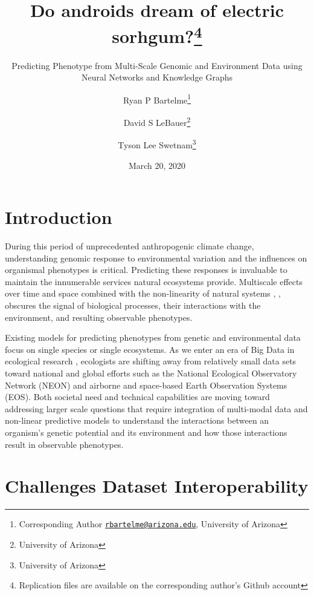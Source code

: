 \documentclass[11pt,]{article}
\title{Do androids dream of electric sorhgum?\thanks{Replication files are available on the corresponding author's Github
account}}
\subtitle{Predicting Phenotype from Multi-Scale Genomic and Environment Data using
Neural Networks and Knowledge Graphs}
\author{Ryan P Bartelme\footnote{Corresponding Author
  \href{mailto:rbartelme@arizona.edu}{\nolinkurl{rbartelme@arizona.edu}},
  University of Arizona} \and David S LeBauer\footnote{University of Arizona} \and Tyson Lee Swetnam\footnote{University of Arizona}}
\date{March 20, 2020}
\begin{document}
\maketitle

\hypertarget{introduction}{%
\section{Introduction}\label{introduction}}

During this period of unprecedented anthropogenic climate change,
understanding genomic response to environmental variation and the
influences on organismal phenotypes is critical. Predicting these
responses is invaluable to maintain the innumerable services natural
ecosystems provide. Multiscale effects over time and space combined with
the non-linearity of natural systems \citet{lorenz1963deterministic},
\citet{ruel1999jensen}, \citet{west2009general} obscures the signal of
biological processes, their interactions with the environment, and
resulting observable phenotypes.

Existing models for predicting phenotypes from genetic and environmental
data focus on single species or single ecosystems. As we enter an era of
Big Data in ecological research \citet{balch2020neon}, ecologists are
shifting away from relatively small data sets toward national and global
efforts such as the National Ecological Observatory Network (NEON)
\citet{keller2008continental} and airborne and space-based Earth
Observation Systems (EOS). Both societal need and technical capabilities
are moving toward addressing larger scale questions that require
integration of multi-modal data and non-linear predictive models to
understand the interactions between an organism's genetic potential and
its environment and how those interactions result in observable
phenotypes.

\hypertarget{challenges-dataset-interoperability}{%
\section{Challenges Dataset
Interoperability}\label{challenges-dataset-interoperability}}
\end{document}
